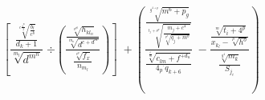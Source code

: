 \documentclass[11pt]{beamer}
\begin{document}
\begin{frame}

\begin{Huge}
$$\left[ \frac{\frac{\sqrt[c\frac{4^m}{3}]{\frac{b_l}{c^b}}}{d_k+1}}{\sqrt[m_l]{d^{m^n}}}\; \text{÷} \left( \frac{\frac{\sqrt[c^{p^q}]{h_{kl_n}}}{\sqrt[m_n]{d^{c+d^m}}}}{\frac{\sqrt[c^p]{f_x}}{n_{m_l}}}\right)\right] \; + \left(	\frac{\frac{\sqrt[g^{4+p}]{m^6+p_g}}{\sqrt[t_j+c^p]{\frac{m_j+c^4}{\sqrt[p^b]{q_j+m^b}}}}}{\frac{\sqrt[\frac{t}{m}]{c_{lm} + f^{+d_u}}}{{4_p}^.q_{k+6}}}	\; - \frac{\frac{\sqrt[m]{t_i+4^p}}{x_{k_l}-\sqrt[p]{h^o}}}{\frac{\sqrt[g^4]{m_k}}{S_{j_e}}} 	\right)$$
\end{Huge}


\end{frame}
\end{document}

